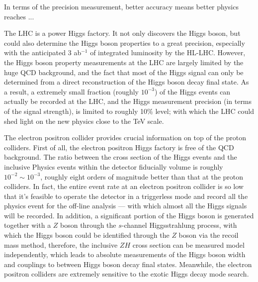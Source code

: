 In terms of the precision measurement, better accuracy means better physics reaches ...

The LHC is a power Higgs factory. It not only discovers the Higgs boson,
but could also determine the Higgs boson properties to a great precision,
especially with the anticipated 3 ab$^{-1}$ of integrated luminosity by the HL-LHC.
However, the Higgs boson property measurements at the LHC are largely limited by the huge QCD background,
and the fact that most of the Higgs signal can only be determined from a direct reconstruction of the Higgs boson decay final state.
As a result, a extremely small fraction (roughly $10^{-3}$) of the Higgs events can actually be recorded at the LHC,
and the Higgs measurement precision (in terms of the signal strength),
is limited to roughly 10\% level;
with which the LHC could shed light on the new physics close to the TeV scale. 

The electron positron collider provides crucial information on top of the proton colliders.
First of all, the electron positron Higgs factory is free of the QCD background.
The ratio between the cross section of the Higgs events
and the inclusive Physics events within the detector fiducially volume is roughly $10^{-2} \sim 10^{-3}$,
roughly eight orders of magnitude better than that at the proton colliders.
In fact, the entire event rate at an electron positron collider is so low
that it's feasible to operate the detector in a triggerless mode
and record all the physics event for the off-line analysis --- with which almost all the Higgs signals will be recorded.
In addition, a significant portion of the Higgs boson is generated together with a $Z$ boson
through the $s$-channel Higgsstrahlung process,
with which the Higgs boson could be identified through the $Z$ boson via the recoil mass method,
therefore, the inclusive $ZH$ cross section can be measured model independently,
which leads to absolute measurements of the Higgs boson width and couplings to between Higgs boson decay final states.
Meanwhile, the electron positron colliders are extremely sensitive to the exotic Higgs decay mode search. 

